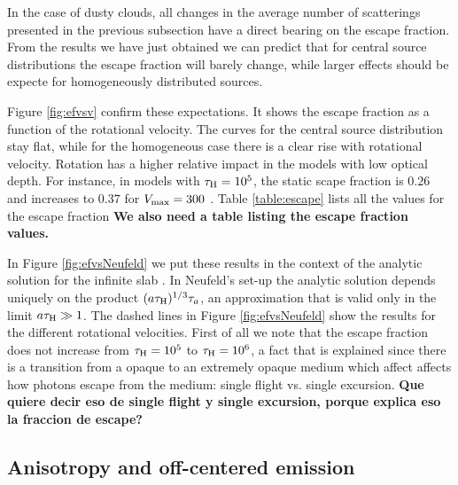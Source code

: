\documentclass{emulateapj}
\newcommand{\ly}{{\ifmmode{{\rm Ly}\alpha~}\else{Ly$\alpha$~}\fi}}
\newcommand{\kms}{{\ifmmode{{\mathrm{\,km\ s}^{-1}}}\else{\,km~s$^{-1}$}\fi}}
\begin{document}
In the case of dusty clouds, all changes in the average number
of scatterings presented in the previous subsection have a direct
bearing on the escape fraction. From the results we have just obtained
we can predict that for central source distributions the escape
fraction will barely change, while larger effects should be expecte
for homogeneously distributed sources. 

Figure \ref{fig:efvsv} confirm these expectations. It shows the escape
fraction as a function of the rotational velocity. The curves for the
central source distribution stay flat, while for the homogeneous case
there is a clear rise with rotational velocity.  Rotation has a higher relative impact in
the models with low optical depth. For instance, in models with
$\tau_{\rm H}=10^5$, the static scape fraction is $0.26$ and increases
to $0.37$ for $V_{\rm max}=300$ \kms. Table \ref{table:escape} lists
all the values for the escape fraction {\bf We also need a table
  listing the escape  fraction values.}  

In Figure \ref{fig:efvsNeufeld} we put these results in the context of
the analytic solution for the infinite slab \citep{Neufeld90}. In
Neufeld's set-up the analytic solution depends uniquely on the product
$(a\tau_{\rm   H})^{1/3}\tau_{a}$, an approximation that is valid only
in the limit $a\tau_{\rm   H}\gg 1$. The dashed lines in Figure
\ref{fig:efvsNeufeld} show the results for the different rotational
velocities. First of all we note that the escape fraction does not
increase from $\tau_{\rm H}=10^{5}$ to $\tau_{\rm H}=10^{6}$, a fact
that is explained since there is a transition from a opaque to an extremely opaque medium
which affect affects how \ly photons escape from the medium: single flight 
vs. single excursion. {\bf Que quiere decir eso de single flight y
  single excursion, porque explica eso la fraccion de escape?} 

\subsection{Anisotropy and off-centered emission}
\end{document}

